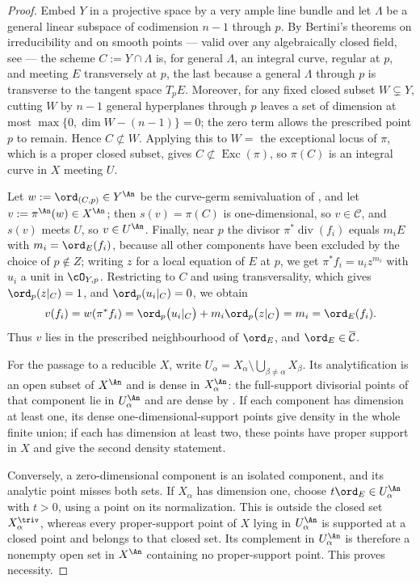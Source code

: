 \begin{proof}
Embed $Y$ in a projective space by a very ample line bundle and let
$\Lambda$ be a general linear subspace of codimension $n-1$ through
$p$.  By Bertini's theorems on irreducibility and on smooth points ---
valid over any algebraically closed field, see \cite[\S6]{Jou80} --- the
scheme $C:=Y\cap\Lambda$ is, for general $\Lambda$, an integral curve,
regular at $p$, and meeting $E$ transversely at $p$, the last because
a general $\Lambda$ through $p$ is transverse to the tangent space
$T_pE$.  Moreover, for any fixed closed subset $W\subsetneq Y$, cutting
$W$ by $n-1$ general hyperplanes through $p$ leaves a set of dimension at most
$\max\{0,\dim W-(n-1)\}=0$; the zero term allows the prescribed
point $p$ to remain.  Hence $C\not\subset W$.  Applying this to
$W=$ the exceptional locus of $\pi$, which is a proper closed subset,
gives $C\not\subset\operatorname{Exc}(\pi)$, so $\pi(C)$ is an integral
curve in $X$ meeting $U$.

Let $w:=\ord_{(C,p)}\in Y^{\An}$ be the curve-germ semivaluation of
, and let $v:=\pi^{\An}(w)\in X^{\An}$; then
$s(v)=\pi(C)$ is one-dimensional, so $v\in\mathcal C$, and $s(v)$ meets
$U$, so $v\in U^{\An}$.  Finally, near $p$ the divisor
$\pi^*\operatorname{div}(f_i)$ equals $m_iE$ with
$m_i=\ord_E(f_i)$, because all other components have been excluded by the
choice of $p\notin Z$; writing $z$ for a local equation of $E$ at
$p$, we get $\pi^*f_i=u_iz^{m_i}$ with $u_i$ a unit in
$\cO_{Y,p}$.  Restricting to $C$ and using transversality, which gives
$\ord_p(z|_C)=1$, and $\ord_p(u_i|_C)=0$, we obtain
\[
 v(f_i)=w(\pi^*f_i)=\ord_p\bigl(u_i|_C\bigr)+m_i\ord_p\bigl(z|_C\bigr)
 =m_i=\ord_E(f_i).
\]
Thus $v$ lies in the prescribed neighbourhood of $\ord_E$, and
$\ord_E\in\overline{\mathcal C}$.

For the passage to a reducible $X$, write
$U_\alpha=X_\alpha\setminus\bigcup_{\beta\neq\alpha}X_\beta$.
Its analytification is an open subset of $X^{\An}$ and is dense in
$X_\alpha^{\An}$: the full-support divisorial points of that component
lie in $U_\alpha^{\An}$ and are dense by
.  If each component has dimension at
least one, its dense one-dimensional-support points give density in the
whole finite union; if each has dimension at least two, these points
have proper support in $X$ and give the second density statement.

Conversely, a zero-dimensional component is an isolated component, and
its analytic point misses both sets.  If $X_\alpha$ has dimension one,
choose $t\ord_E\in U_\alpha^{\An}$ with $t>0$, using a point on its
normalization.  This is outside the closed set $X_\alpha^{\triv}$,
whereas every proper-support point of $X$ lying in $U_\alpha^{\An}$
is supported at a closed point and belongs to that closed set.  Its
complement in $U_\alpha^{\An}$ is therefore a nonempty open set in
$X^{\An}$ containing no proper-support point.  This proves necessity.
\end{proof}

